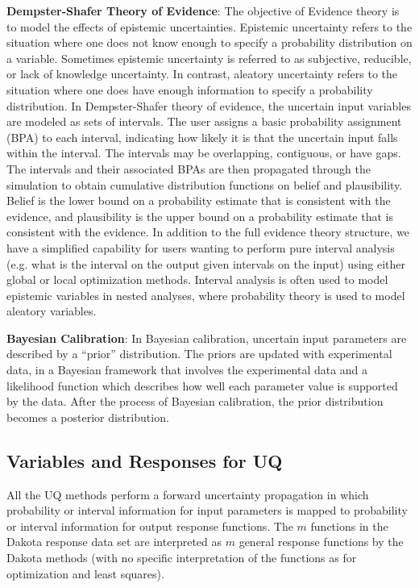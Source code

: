 \textbf{Dempster-Shafer Theory of Evidence}: The objective of Evidence
theory is to model the effects of epistemic uncertainties. Epistemic
uncertainty refers to the situation where one does not know enough
to specify a probability distribution on a variable. Sometimes epistemic
uncertainty is referred to as subjective, reducible, or lack of knowledge
uncertainty. In contrast, aleatory uncertainty refers to the situation
where one does have enough information to specify a probability distribution.
In Dempster-Shafer theory of evidence, the uncertain input variables
are modeled as sets of intervals. The user assigns a basic probability
assignment (BPA) to each interval, indicating how likely it is that the
uncertain input falls within the interval. The intervals may be
overlapping, contiguous, or have gaps. The intervals and their associated
BPAs are then propagated through the simulation to obtain cumulative
distribution functions on belief and plausibility. Belief is the lower
bound on a probability estimate that is consistent with the evidence, and
plausibility is the upper bound on a probability estimate that is consistent
with the evidence. In addition to the full evidence theory structure, 
we have a simplified capability for users wanting to perform pure 
interval analysis (e.g. what is the interval on the output given 
intervals on the input) using either global or local optimization methods. 
Interval analysis is often used to model epistemic variables in 
nested analyses, where probability theory is used to model aleatory variables.

\textbf{Bayesian Calibration}:  In Bayesian calibration, uncertain 
input parameters are described by a ``prior'' distribution. The priors
are updated with experimental data, in a Bayesian framework that 
involves the experimental data and a likelihood function which describes 
how well each parameter value is supported by the data. After the process
of Bayesian calibration, the prior distribution becomes a posterior 
distribution. 

\subsection{Variables and Responses for UQ}\label{uq:overview:varsresp}

All the UQ methods perform a forward uncertainty propagation in which
probability or interval information for input parameters is mapped to
probability or interval information for output response functions. The
$m$ functions in the Dakota response data set are interpreted as $m$
general response functions by the Dakota methods (with no specific
interpretation of the functions as for optimization and least
squares).

